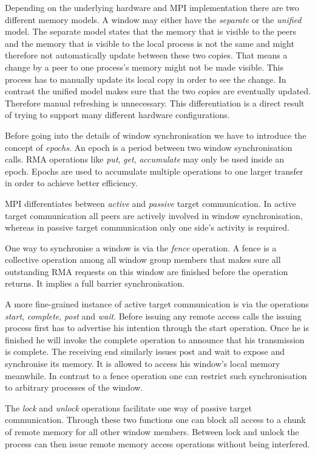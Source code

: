 \documentclass[a4paper, 10pt]{article}
\begin{document}
Depending on the underlying hardware and MPI implementation there are two different memory models. A window may either have the \emph{separate} or the \emph{unified} model. The separate model states that the memory that is visible to the peers and the memory that is visible to the local process is not the same and might therefore not automatically update between these two copies. That means a change by a peer to one process's memory might not be made visible. This process has to manually update its local copy in order to see the change. In contrast the unified model makes sure that the two copies are eventually updated. Therefore manual refreshing is unnecessary. This differentiation is a direct result of trying to support many different hardware configurations.

Before going into the details of window synchronisation we have to introduce the concept of \emph{epochs}. An epoch is a period between two window synchronisation calls. RMA operations like \emph{put}, \emph{get}, \emph{accumulate} may only be used inside an epoch. Epochs are used to accumulate multiple operations to one larger transfer in order to achieve better efficiency.

MPI differentiates between \emph{active} and \emph{passive} target communication. In active target communication all peers are actively involved in window synchronisation, whereas in passive target communication only one side's activity is required.

One way to synchronise a window is via the \emph{fence} operation. A fence is a collective operation among all window group members that makes sure all outstanding RMA requests on this window are finished before the operation returns. It implies a full barrier synchronisation.

A more fine-grained instance of active target communication is via the operations \emph{start}, \emph{complete}, \emph{post} and \emph{wait}. Before issuing any remote access calls the issuing process first has to advertise his intention through the start operation. Once he is finished he will invoke the complete operation to announce that his transmission is complete. The receiving end similarly issues post and wait to expose and synchronise its memory. It is allowed to access his window's local memory meanwhile. In contrast to a fence operation one can restrict such synchronisation to arbitrary processes of the window.

The \emph{lock} and \emph{unlock} operations facilitate one way of passive target communication. Through these two functions one can block all access to a chunk of remote memory for all other window members. Between lock and unlock the process can then issue remote memory access operations without being interfered.
\end{document}
